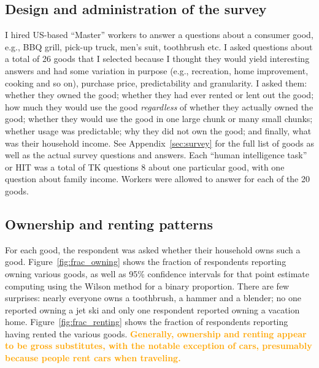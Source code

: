 \documentclass[11pt]{article}
\newcommand{\important}[1]{\textcolor{orange}{\textbf{#1}}}
\newcommand{\important}[1]{#1}
\begin{document}
\subsection{Design and administration of the survey}
I hired US-based ``Master'' workers to answer a questions about a consumer good, e.g., BBQ grill, pick-up truck, men's suit, toothbrush etc.
I asked questions about a total of 26 goods that I selected because I thought they would yield interesting answers and had some variation in purpose (e.g., recreation, home improvement, cooking and so on), purchase price, predictability and granularity. 
I asked them: whether they owned the good; whether they had ever rented or lent out the good; how much they would use the good \emph{regardless} of whether they actually owned the good; whether they would use the good in one large chunk or many small chunks; whether usage was predictable; why they did not own the good; and finally, what was their household income. 
See Appendix~\ref{sec:survey} for the full list of goods as well as the actual survey questions and answers.  
Each ``human intelligence task'' or HIT was a total of TK questions 8 about one particular good, with one question about family income. 
Workers were allowed to answer for each of the 20 goods.  
 
\subsection{Ownership and renting patterns} 
For each good, the respondent was asked whether their household owns such a good. 
Figure~\ref{fig:frac_owning} shows the fraction of respondents reporting owning various goods, as well as 95\% confidence intervals for that point estimate computing using the Wilson method for a binary proportion.    
There are few surprises: nearly everyone owns a toothbrush, a hammer and a blender; no one reported owning a jet ski and only one respondent reported owning a vacation home.
Figure~\ref{fig:frac_renting} shows the fraction of respondents reporting having rented the various goods. 
\important{Generally, ownership and renting appear to be gross substitutes, with the notable exception of cars, presumably because people rent cars when traveling.}
\end{document}
